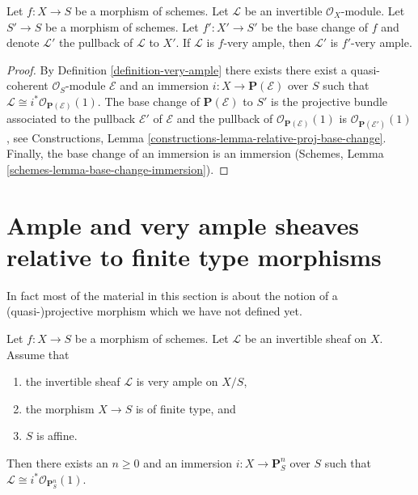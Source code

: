 \begin{lemma}
\label{lemma-very-ample-base-change}
Let $f : X \to S$ be a morphism of schemes.
Let $\mathcal{L}$ be an invertible $\mathcal{O}_X$-module.
Let $S' \to S$ be a morphism of schemes.
Let $f' : X' \to S'$ be the base change of $f$ and denote
$\mathcal{L}'$ the pullback of $\mathcal{L}$ to $X'$.
If $\mathcal{L}$ is $f$-very ample, then $\mathcal{L}'$ is $f'$-very ample.
\end{lemma}

\begin{proof}
By Definition \ref{definition-very-ample} there exists there exist a
quasi-coherent $\mathcal{O}_S$-module $\mathcal{E}$ and an immersion
$i : X \to \mathbf{P}(\mathcal{E})$ over $S$ such that
$\mathcal{L} \cong i^*\mathcal{O}_{\mathbf{P}(\mathcal{E})}(1)$.
The base change of $\mathbf{P}(\mathcal{E})$ to $S'$ is
the projective bundle associated to the pullback $\mathcal{E}'$
of $\mathcal{E}$ and the pullback of
$\mathcal{O}_{\mathbf{P}(\mathcal{E})}(1)$
is
$\mathcal{O}_{\mathbf{P}(\mathcal{E}')}(1)$, see
Constructions, Lemma \ref{constructions-lemma-relative-proj-base-change}.
Finally, the base change
of an immersion is an immersion
(Schemes, Lemma \ref{schemes-lemma-base-change-immersion}).
\end{proof}







\section{Ample and very ample sheaves relative to finite type morphisms}
\label{section-ample-finite-type}

\noindent
In fact most of the material in this section is about the notion of
a (quasi-)projective morphism which we have not defined yet.

\begin{lemma}
\label{lemma-very-ample-finite-type-over-affine}
Let $f : X \to S$ be a morphism of schemes.
Let $\mathcal{L}$ be an invertible sheaf on $X$.
Assume that
\begin{enumerate}
\item the invertible sheaf $\mathcal{L}$ is very ample on $X/S$,
\item the morphism $X \to S$ is of finite type, and
\item $S$ is affine.
\end{enumerate}
Then there exists an $n \geq 0$ and an immersion
$i : X \to \mathbf{P}^n_S$ over $S$ such that
$\mathcal{L} \cong i^*\mathcal{O}_{\mathbf{P}^n_S}(1)$.
\end{lemma}

